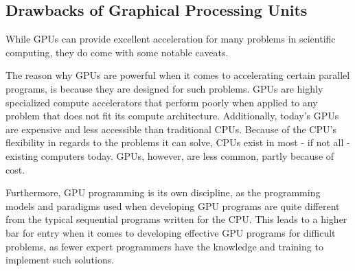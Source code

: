\subsection{Drawbacks of Graphical Processing Units}
While GPUs can provide excellent acceleration for many problems in scientific computing, they do come with some notable caveats.

The reason why GPUs are powerful when it comes to accelerating certain parallel programs, is because they are designed for such problems.
GPUs are highly specialized compute accelerators that perform poorly when applied to any problem that does not fit its compute architecture.
Additionally, today's GPUs are expensive and less accessible than traditional CPUs.
Because of the CPU's flexibility in regards to the problems it can solve, CPUs exist in most - if not all - existing computers today.
GPUs, however, are less common, partly because of cost.

Furthermore, GPU programming is its own discipline, as the programming models and paradigms used when developing GPU programs are quite different from the typical sequential programs written for the CPU.
This leads to a higher bar for entry when it comes to developing effective GPU programs for difficult problems, as fewer expert programmers have the knowledge and training to implement such solutions.


